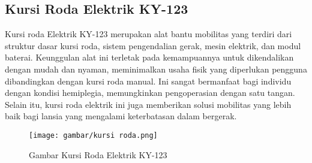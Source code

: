 \subsection{Kursi Roda Elektrik KY-123}
Kursi roda Elektrik KY-123 merupakan alat bantu mobilitas yang terdiri dari struktur dasar kursi roda, sistem pengendalian gerak, mesin elektrik, dan modul baterai. Keunggulan alat ini terletak pada kemampuannya untuk dikendalikan dengan mudah dan nyaman, meminimalkan usaha fisik yang diperlukan pengguna dibandingkan dengan kursi roda manual. Ini sangat bermanfaat bagi individu dengan kondisi hemiplegia, memungkinkan pengoperasian dengan satu tangan. Selain itu, kursi roda elektrik ini juga memberikan solusi mobilitas yang lebih baik bagi lansia yang mengalami keterbatasan dalam bergerak.

\begin{figure}[H]
  \centering

  \texttt{[image: gambar/kursi roda.png]}

  \caption{Gambar Kursi Roda Elektrik KY-123}
  \label{fig:roketluarangkasa}
\end{figure}